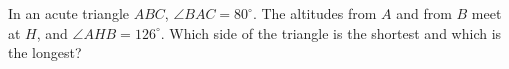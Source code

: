 In an acute triangle $ABC$, $\angle BAC=80^\circ$. The altitudes from $A$ and from $B$ meet at $H$, and $\angle AHB=126^\circ$. Which side of the triangle is the shortest and which is the longest?
